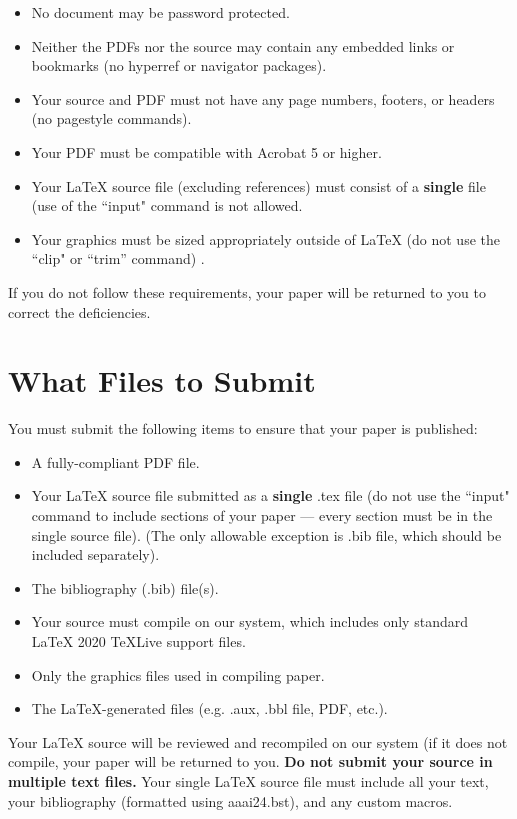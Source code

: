 \documentclass[letterpaper]{article} %
\begin{document}
{\begin{itemize}
\item No document may be password protected.
\item Neither the PDFs nor the source may contain any embedded links or bookmarks (no hyperref or navigator packages).
\item Your source and PDF must not have any page numbers, footers, or headers (no pagestyle commands).
\item Your PDF must be compatible with Acrobat 5 or higher.
\item Your \LaTeX{} source file (excluding references) must consist of a \textbf{single} file (use of the ``input" command is not allowed.
\item Your graphics must be sized appropriately outside of \LaTeX{} (do not use the ``clip" or ``trim'' command) .
\end{itemize}

If you do not follow these requirements, your paper will be returned to you to correct the deficiencies.

\section{What Files to Submit}
You must submit the following items to ensure that your paper is published:
\begin{itemize}
\item A fully-compliant PDF file.
\item Your \LaTeX{} source file submitted as a \textbf{single} .tex file (do not use the ``input" command to include sections of your paper --- every section must be in the single source file). (The only allowable exception is .bib file, which should be included separately).
\item The bibliography (.bib) file(s).
\item Your source must compile on our system, which includes only standard \LaTeX{} 2020 TeXLive support files.
\item Only the graphics files used in compiling paper.
\item The \LaTeX{}-generated files (e.g. .aux,  .bbl file, PDF, etc.).
\end{itemize}

Your \LaTeX{} source will be reviewed and recompiled on our system (if it does not compile, your paper will be returned to you. \textbf{Do not submit your source in multiple text files.} Your single \LaTeX{} source file must include all your text, your bibliography (formatted using aaai24.bst), and any custom macros.

}
\end{document}
